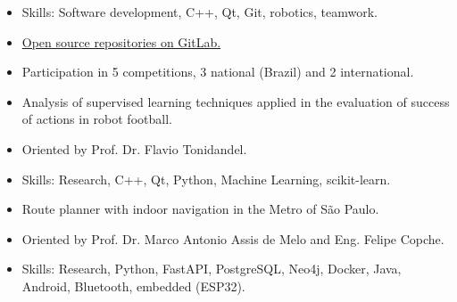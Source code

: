 \documentclass[10pt,a4paper,ragged2e,withhyper]{altacv}
\begin{document}
\begin{paracol}{2}

\begin{itemize}
\item Skills: Software development, C++, Qt, Git, robotics, teamwork.
\item \href{https://gitlab.com/robofei/ssl}{Open source repositories on GitLab.}
\item Participation in 5 competitions, 3 national (Brazil) and 2 international.
\end{itemize}


\begin{itemize}
\item Analysis of supervised learning techniques applied in the evaluation of success of actions in robot football.
\item Oriented by Prof. Dr. Flavio Tonidandel.
\item Skills: Research, C++, Qt, Python, Machine Learning, scikit-learn.
\end{itemize}

\divider

\begin{itemize}
  \item Route planner with indoor navigation in the Metro of São Paulo.
  \item Oriented by Prof. Dr. Marco Antonio Assis de Melo and Eng. Felipe Copche.
  \item Skills: Research, Python, FastAPI, PostgreSQL, Neo4j, Docker, Java, Android, Bluetooth, embedded (ESP32).
\end{itemize}
  
\medskip




\end{paracol}
\end{document}

